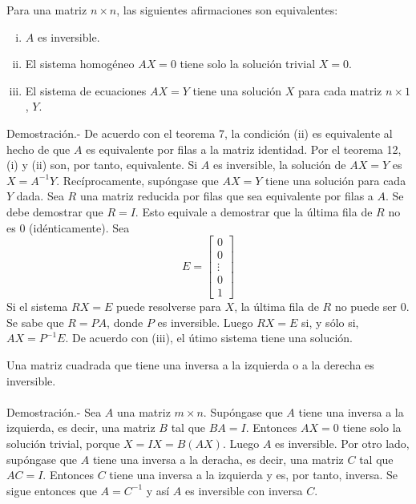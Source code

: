 \begin{teo}
    Para una matriz $n\times n$, las siguientes afirmaciones son equivalentes:
    \begin{enumerate}[(i)]
	\item $A$ es inversible.
	\item El sistema homogéneo $AX=0$ tiene solo la solución trivial $X=0$.
	\item El sistema de ecuaciones $AX=Y$ tiene una solución $X$ para cada matriz $n\times 1$, $Y$.\\
    \end{enumerate}
	Demostración.-\; De acuerdo con el teorema 7, la condición (ii) es equivalente al hecho de que $A$ es equivalente por filas a la matriz identidad. Por el teorema 12, (i) y (ii) son, por tanto, equivalente. Si $A$ es inversible, la solución de $AX=Y$ es $X=A^{-1}Y$. Recíprocamente, supóngase que $AX=Y$ tiene una solución para cada $Y$ dada. Sea $R$ una matriz reducida por filas que sea equivalente por filas a $A$. Se debe demostrar que $R=I$. Esto equivale a demostrar que la última fila de $R$ no es $0$ (idénticamente). Sea
	$$
	E = 
	\left[
	    \begin{array}{c}
		0 \\
		0 \\
		\vdots \\
		0 \\
		1
	    \end{array}
	\right]
	$$
    Si el sistema $RX=E$ puede resolverse para $X$, la última fila de $R$ no puede ser $0$. Se sabe que $R=PA$, donde $P$ es inversible. Luego $RX=E$ si, y sólo si, $AX=P^{-1}E$. De acuerdo con (iii), el útimo sistema tiene una solución.
\end{teo}

\begin{cor}
    Una matriz cuadrada que tiene una inversa a la izquierda o a la derecha es inversible.\\\\
	Demostración.-\; Sea $A$ una matriz $m\times n$. Supóngase que $A$ tiene una inversa a la izquierda, es decir, una matriz $B$ tal que $BA=I$. Entonces $AX=0$ tiene solo la solución trivial, porque $X=IX=B(AX)$. Luego $A$ es inversible. Por otro lado, supóngase que $A$ tiene una inversa a la deracha, es decir, una matriz $C$ tal que $AC=I$. Entonces $C$ tiene una inversa a la izquierda y es, por tanto, inversa. Se sigue entonces que $A=C^{-1}$ y así $A$ es inversible con inversa $C$.
\end{cor}


